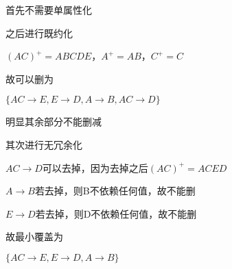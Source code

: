 \documentclass[UTF8]{ctexart}
\begin{document}
首先不需要单属性化

之后进行既约化

$(AC)^+ = ABCDE$，$A^+ = AB$，$C^+ = C$

故可以删为

$\{
    AC\rightarrow E,
    E\rightarrow D,
    A\rightarrow B,
    AC\rightarrow D
\}$

明显其余部分不能删减

其次进行无冗余化

$AC\rightarrow D$可以去掉，因为去掉之后$(AC)^+ = ACED$

$A\rightarrow B$若去掉，则B不依赖任何值，故不能删

$E\rightarrow D$若去掉，则D不依赖任何值，故不能删

故最小覆盖为

$\{
    AC\rightarrow E,
    E\rightarrow D,
    A\rightarrow B
\}$
\end{document}
